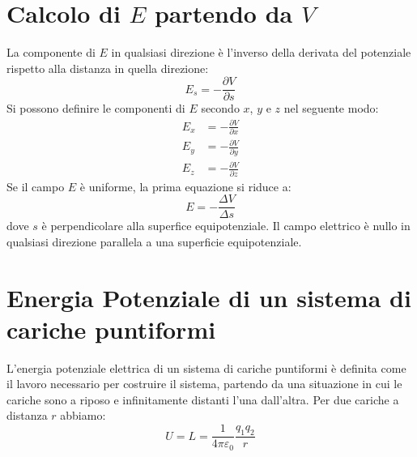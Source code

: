         \section{Calcolo di $E$ partendo da $V$} La componente di $E$ in 
        qualsiasi direzione è l'inverso della derivata del potenziale rispetto
        alla distanza in quella direzione:
            \begin{equation}
                E_s = - \frac{\partial V}{\partial s}
            \end{equation}
        Si possono definire le componenti di $E$ secondo $x$, $y$ e $z$ nel 
        seguente modo:
            \begin{align}
                E_x &= - \frac{\partial V}{\partial x}\\
                E_y &= - \frac{\partial V}{\partial y}\\
                E_z &= - \frac{\partial V}{\partial z}
            \end{align}
        Se il campo $E$ è uniforme, la prima equazione si riduce a:
            \begin{equation}
                E = - \frac{\Delta V}{\Delta s}
            \end{equation}
        dove $s$ è perpendicolare alla superfice equipotenziale. Il campo 
        elettrico è nullo in qualsiasi direzione parallela a una superficie 
        equipotenziale.

        \section{Energia Potenziale di un sistema di cariche puntiformi} 
        L'energia potenziale elettrica di un sistema di cariche puntiformi è
        definita come il lavoro necessario per costruire il sistema, partendo
        da una situazione in cui le cariche sono a riposo e infinitamente
        distanti l'una dall'altra. Per due cariche a distanza $r$ abbiamo:
            \begin{equation}
                U = L = \frac{1}{4\pi\varepsilon_0}\frac{q_1q_2}{r}
            \end{equation}